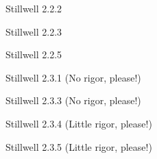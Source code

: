 \documentclass[minion]{homework}
\begin{document}
\begin{problems}
\problem Stillwell 2.2.2

\problem Stillwell 2.2.3

\problem Stillwell 2.2.5

\problem Stillwell 2.3.1 (No rigor, please!)

\problem Stillwell 2.3.3 (No rigor, please!)

\problem Stillwell 2.3.4 (Little rigor, please!)

\problem Stillwell 2.3.5 (Little rigor, please!)



\end{problems}
\end{document}
